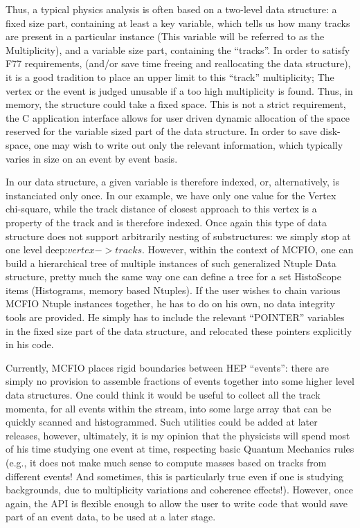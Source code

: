 Thus, a typical physics analysis is often based on a two-level  data structure:
a fixed size  part, containing at least a key variable, which   tells us how
many tracks are present in a particular instance (This variable will be referred
to as the Multiplicity), and a variable size part, containing the ``tracks''. In
order to satisfy F77 requirements,  (and/or save  time freeing and reallocating
the data structure), it is a good  tradition to place an upper limit to this
``track'' multiplicity;  The vertex or the event is judged unusable if 
a too high multiplicity is found. Thus, in memory,  the structure could take a 
fixed space. This is not a strict requirement, the C application interface
allows for  user driven dynamic allocation of the space reserved for the 
variable sized part of the data structure.  In order to save disk-space, one 
may wish to write out only the relevant information, which typically varies 
in size on an event by event basis. 

In our data structure, a given variable is therefore indexed, or, alternatively,  is
instanciated only once. In our example, we have only one value for the  Vertex
chi-square, while the track distance of closest approach to this  vertex is a
property of the track and is therefore indexed. Once again this type of data
structure does not support arbitrarily nesting of substructures:  we simply stop
at one level deep:$vertex -> tracks$. However, within the context of MCFIO,  one
can build a hierarchical tree of multiple instances of such generalized  Ntuple
Data structure, pretty much the same way one can define a tree for  a set
HistoScope items (Histograms, memory based Ntuples).  If the user  wishes to
chain various MCFIO Ntuple instances together, he has to do on his own, no
data integrity tools are provided.  He simply has to include the relevant
``POINTER'' variables in the fixed size part of the data structure, and
relocated these pointers explicitly in his code.

Currently, MCFIO places rigid boundaries between HEP ``events'':  there are
simply no provision to assemble fractions of events together into some
higher level data structures. One could think it would be useful to collect all the track
momenta, for all events within the stream, into some large array that can be
quickly scanned and histogrammed.  Such utilities could be added at later
releases, however, ultimately, it is my opinion that the physicists will spend
most of his time studying  one event at time, respecting basic Quantum
Mechanics rules (e.g., it does not  make much sense to compute masses based on
tracks from different events! And  sometimes, this is particularly true even if
one is studying backgrounds, due to  multiplicity variations and coherence
effects!).  However, once again, the API is flexible enough to allow the user
to write code that would save part of an event data, to be used at a later
stage.    
 
